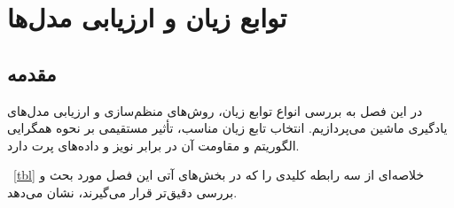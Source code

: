 \chapter{توابع زیان و ارزیابی مدل‌ها}\label{chap:3}

\section{مقدمه}\label{sec:3-1}
در این فصل به بررسی انواع توابع زیان، روش‌های منظم‌سازی و ارزیابی مدل‌های یادگیری ماشین می‌پردازیم. انتخاب تابع زیان مناسب، تأثیر مستقیمی بر نحوه همگرایی الگوریتم و مقاومت آن در برابر نویز و داده‌های پرت دارد. 

\tablename~\ref{tbl}
 خلاصه‌ای از سه رابطه کلیدی را که در بخش‌های آتی این فصل مورد بحث و بررسی دقیق‌تر قرار می‌گیرند، نشان می‌دهد.
